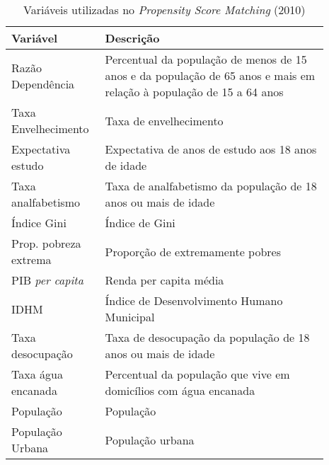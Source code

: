 \begin{table}[H]
    \centering
    \caption{Variáveis utilizadas no \textit{Propensity Score Matching} (2010)}

    \begin{tabular}{m{0.23\linewidth}|m{0.66\linewidth}}
        Variável & Descrição \\

        \toprule\toprule
        Razão Dependência & Percentual da população de menos de 15 anos e da população de 65 anos e mais em relação à população de 15 a 64 anos \\

        \midrule
        Taxa Envelhecimento	 & Taxa de envelhecimento \\

        \midrule
        Expectativa estudo & Expectativa de anos de estudo aos 18 anos de idade \\

        \midrule
        Taxa analfabetismo & Taxa de analfabetismo da população de 18 anos ou mais de idade	\\

        \midrule
        Índice Gini & Índice de Gini \\

        \midrule
        Prop. pobreza extrema & Proporção de extremamente pobres \\

        \midrule
        PIB \textit{per capita} & Renda per capita média \\

        \midrule
        IDHM & Índice de Desenvolvimento Humano Municipal \\

        \midrule
        Taxa desocupação & Taxa de desocupação da população de 18 anos ou mais de idade	
        \\

        \midrule
        Taxa água encanada & Percentual da população que vive em domicílios com água encanada	
        \\

        \midrule
        População & População \\

        \midrule
        População Urbana & População urbana	
        \\




    \end{tabular}

    \label{tab_variaveis-psm}
\end{table}

